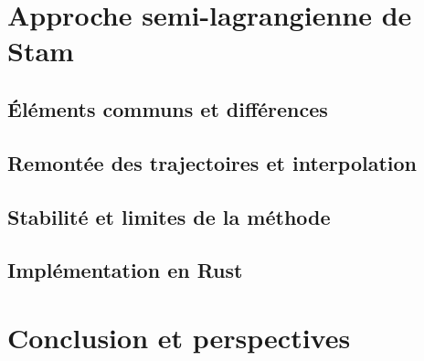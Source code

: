 \documentclass[a4paper,12pt,twoside]{article}
\begin{document}
    \section{Approche semi-lagrangienne de Stam}
        \subsection{Éléments communs et différences}
        \subsection{Remontée des trajectoires et interpolation}
        \subsection{Stabilité et limites de la méthode}
        \subsection{Implémentation en Rust}

    \section{Conclusion et perspectives}

    \clearpage
    \printbibliography[heading=bibintoc,title={Bibliographie}]
    
    \begin{appendices}
        \clearpage
        

        \clearpage
        
    \end{appendices}
\end{document}
